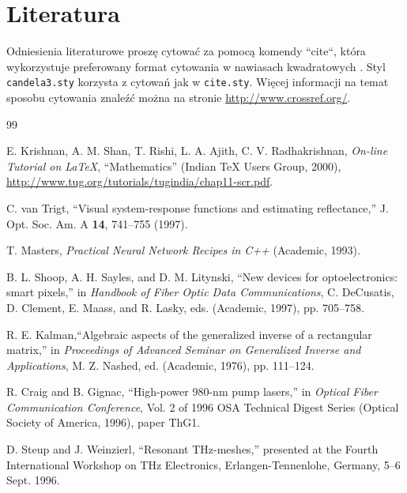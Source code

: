 \documentclass[letterpaper, 10pt]{article}
\begin{document}
\section{Literatura}
Odniesienia literaturowe proszę cytować za pomocą komendy ``cite``, która wykorzystuje preferowany format cytowania w nawiasach kwadratowych \cite{krishnan00,vantrigt97,masters93,shoop97,kalman76,craig96,steup96}. Styl \texttt{candela3.sty} korzysta z cytowań jak w \texttt{cite.sty}. Więcej informacji na temat sposobu cytowania znaleźć można na stronie \href{http://www.crossref.org/}{http://www.crossref.org/}.

\begin{thebibliography}{99} %

 E. Krishnan, A. M. Shan, T. Rishi, L. A. Ajith, C. V.
Radhakrishnan, \textit{On-line Tutorial on \LaTeX{}},
``Mathematics'' (Indian \TeX{} Users Group, 2000), \\
\url{http://www.tug.org/tutorials/tugindia/chap11-scr.pdf}.

 C. van Trigt, ``Visual system-response functions and estimating reflectance,''
J. Opt. Soc. Am. A \textbf{14}, 741--755 (1997).

 T. Masters, \emph{Practical Neural Network Recipes in C++} (Academic, 1993).

 B. L. Shoop, A. H. Sayles, and D. M. Litynski, ``New devices for optoelectronics: smart pixels,''
in \emph{Handbook of Fiber Optic Data Communications},
C. DeCusatis, D. Clement, E. Maass, and R. Lasky, eds. (Academic, 1997), pp. 705--758.

 R. E. Kalman,``Algebraic aspects of the generalized inverse of a rectangular matrix,'' in
\emph{Proceedings of Advanced Seminar on Generalized Inverse and Applications}, M. Z. Nashed, ed. (Academic, 1976), pp. 111--124.

 R. Craig and B. Gignac, ``High-power 980-nm pump lasers,''
in \emph{Optical Fiber Communication Conference}, Vol. 2 of 1996 OSA Technical Digest Series (Optical Society of America, 1996), paper ThG1.

 D. Steup and J. Weinzierl, ``Resonant THz-meshes,''
presented at the Fourth International Workshop on THz Electronics, Erlangen-Tennenlohe, Germany, 5--6 Sept. 1996.

\end{thebibliography}
\end{document}
